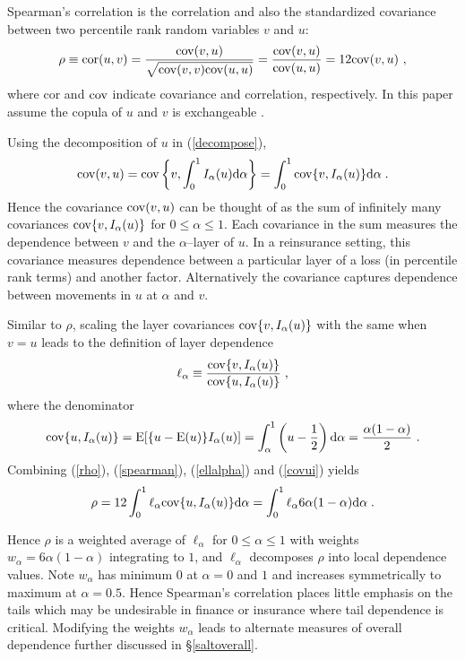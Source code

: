 \documentclass[authoryear]{elsarticle}
\newcommand{\cov}{{\rm cov}}
\newcommand{\E}{{\mathrm E}}
\newcommand{\cor}{\mathrm{cor}}
\newcommand{\de}{\mathrm{d}}
\newcommand{\eref}[1]{(\ref{#1})}
\newcommand{\sref}[1]{\S\ref{#1}}
\begin{document}
Spearman's correlation is the correlation and also the standardized covariance between two percentile rank random variables $v$ and $u$:
\begin{equation}\label{rho}
\rho \equiv \cor(u,v) = \frac{\cov(v,u)}{\sqrt{\cov(v,v)\cov(u,u)}}=\frac{\cov(v,u)}{\cov(u,u)} = 12\cov(v,u)\ ,
\end{equation}
where $\cor$ and $\cov$ indicate covariance and correlation, respectively. In this paper assume the copula of $u$ and $v$ is exchangeable \citep{nelson1999ic}.

Using the decomposition of $u$ in \eref{decompose},
\begin{equation}\label{spearman}
\cov(v,u)=\cov\left\{v,\int_0^1I_\alpha(u)\de \alpha \right\}= \int_0^1 \cov\{v,I_\alpha(u)\} \de \alpha \; .
\end{equation}
Hence the covariance $\cov(v,u)$ can be thought of as the sum  of infinitely many covariances $\cov\{v,I_\alpha(u)\}$ for $0\le\alpha\le 1$. Each covariance in the sum measures the dependence between $v$ and the $\alpha$--layer of $u$. In a reinsurance setting, this covariance measures dependence between a particular layer of a loss (in percentile rank terms) and another factor. Alternatively the covariance captures dependence between movements in $u$ at $\alpha$ and $v$.

 Similar to $\rho$, scaling the layer covariances  $\cov\{v,I_\alpha(u)\}$ with the same when $v=u$ leads to the definition of layer dependence
\begin{equation}\label{ellalpha}
\ell_\alpha \equiv \frac{\cov\{v,I_\alpha(u)\}}{\cov\{u,I_\alpha(u)\}}   \;,
\end{equation}
where the denominator
\begin{equation}\label{covui}
\cov\{u,I_\alpha(u)\}=\E[\{u-\E(u)\}I_\alpha(u)]=\int_\alpha^1 \left(u  - \frac{1}{2}\right)\de \alpha = \frac{\alpha(1-\alpha)}{2}\ .
\end{equation}
Combining \eref{rho}, \eref{spearman}, \eref{ellalpha}  and \eref{covui} yields
\begin{equation}\label{wtdavg}
\rho = 12\int_0^1 \ell_\alpha \cov\{u,I_\alpha(u)\} \de \alpha =  \int_0^1 \ell_\alpha 6\alpha(1-\alpha) \de \alpha \; .
\end{equation}

Hence $\rho$ is a weighted average of $\ell_\alpha$ for $0\le\alpha\le 1$ with weights $w_\alpha=6\alpha(1-\alpha)$ integrating to $1$, and $\ell_\alpha$ decomposes $\rho$ into local dependence values. Note $w_\alpha$ has minimum $0$ at $\alpha=0$ and $1$ and increases symmetrically to maximum at $\alpha=0.5$. Hence Spearman's correlation places little emphasis on the tails which may be undesirable in finance or insurance where tail dependence is critical. Modifying the weights $w_\alpha$ leads to alternate measures of overall dependence further discussed in \sref{saltoverall}.
\end{document}
